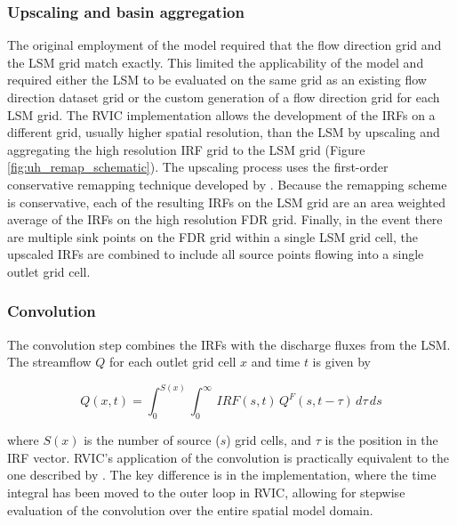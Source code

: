 \documentclass[jgrga, draft]{agutex}
\begin{document}
\begin{article}
\subsubsection{Upscaling and basin aggregation}
\label{sec:remap}

The original employment of the \citet{Lohmann_1996} model required that the flow direction grid and the LSM grid match exactly.
This limited the applicability of the model and required either the LSM to be evaluated on the same grid as an existing flow direction dataset grid or the custom generation of a flow direction grid for each LSM grid.
The RVIC implementation allows the development of the IRFs on a different grid, usually higher spatial resolution, than the LSM by upscaling and aggregating the high resolution IRF grid to the LSM grid (Figure \ref{fig:uh_remap_schematic}).
The upscaling process uses the first-order conservative remapping technique developed by \citet{Jones_1999}. %
Because the remapping scheme is conservative, each of the resulting IRFs on the LSM grid are an area weighted average of the IRFs on the high resolution FDR  grid. %
Finally, in the event there are multiple sink points on the FDR grid within a single LSM grid cell, the upscaled IRFs are combined to include all source points flowing into a single outlet grid cell.

\subsubsection{Convolution}
\label{sec:convolution}

The convolution step combines the IRFs with the discharge fluxes from the LSM.
The streamflow $Q$ for each outlet grid cell $x$ and time $t$ is given by

\begin{equation}
  \label{eq:convolution}
   Q(x,t) = \int_0^{S(x)} \int_0^{\infty}\,IRF(s,t)\,Q^F(s,t-\tau)\,d\tau\,ds
 \end{equation}

where $S(x)$ is the number of source ($s$) grid cells, and $\tau$ is the position in the IRF vector.
RVIC's application of the convolution is practically equivalent to the one described by \citet{Lohmann_1996}.
The key difference is in the implementation, where the time integral has been moved to the outer loop in RVIC, allowing for stepwise evaluation of the convolution over the entire spatial model domain.


\end{article}
\end{document}
